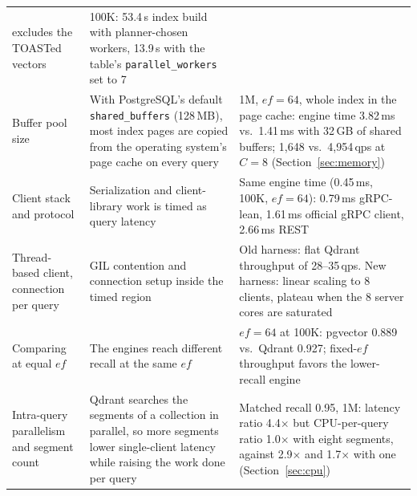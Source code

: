 \documentclass[sigconf, nonacm]{acmart}
\begin{document}
\begin{table}[t]
\begin{tabular}{p{}p{}p{}}
      excludes the TOASTed vectors &
      100K: 53.4\,s index build with planner-chosen workers, 13.9\,s with the table's
      \texttt{parallel\_workers} set to 7 \\
    Buffer pool size &
      With PostgreSQL's default \texttt{shared\_buffers} (128\,MB), most index pages are
      copied from the operating system's page cache on every query &
      1M, $ef=64$, whole index in the page cache: engine time 3.82\,ms vs.\ 1.41\,ms with
      32\,GB of shared buffers; 1{,}648 vs.\ 4{,}954\,qps at $C=8$
      (Section~\ref{sec:memory}) \\
    Client stack and protocol &
      Serialization and client-library work is timed as query latency &
      Same engine time (0.45\,ms, 100K, $ef=64$): 0.79\,ms gRPC-lean, 1.61\,ms official
      gRPC client, 2.66\,ms REST \\
    Thread-based client, connection per query &
      GIL contention and connection setup inside the timed region &
      Old harness: flat Qdrant throughput of 28--35\,qps. New harness: linear scaling to
      8 clients, plateau when the 8 server cores are saturated \\
    Comparing at equal $ef$ &
      The engines reach different recall at the same $ef$ &
      $ef=64$ at 100K: pgvector 0.889 vs.\ Qdrant 0.927; fixed-$ef$ throughput favors the
      lower-recall engine \\
    Intra-query parallelism and segment count &
      Qdrant searches the segments of a collection in parallel, so more segments lower
      single-client latency while raising the work done per query &
      Matched recall 0.95, 1M: latency ratio 4.4$\times$ but CPU-per-query ratio
      1.0$\times$ with eight segments, against 2.9$\times$ and 1.7$\times$ with one
      (Section~\ref{sec:cpu}) \\
    \bottomrule
  \end{tabular}
\end{table}
\end{document}
